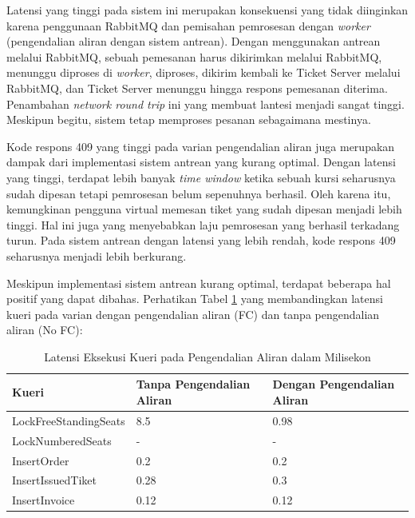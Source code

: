 Latensi yang tinggi pada sistem ini merupakan konsekuensi yang tidak diinginkan karena penggunaan RabbitMQ dan pemisahan pemrosesan dengan \textit{worker} (pengendalian aliran dengan sistem antrean). Dengan menggunakan antrean melalui RabbitMQ, sebuah pemesanan harus dikirimkan melalui RabbitMQ, menunggu diproses di \textit{worker}, diproses, dikirim kembali ke Ticket Server melalui RabbitMQ, dan Ticket Server menunggu hingga respons pemesanan diterima. Penambahan \textit{network round trip} ini yang membuat lantesi menjadi sangat tinggi. Meskipun begitu, sistem tetap memproses pesanan sebagaimana mestinya.

Kode respons 409 yang tinggi pada varian pengendalian aliran juga merupakan dampak dari implementasi sistem antrean yang kurang optimal. Dengan latensi yang tinggi, terdapat lebih banyak \textit{time window} ketika sebuah kursi seharusnya sudah dipesan tetapi pemrosesan belum sepenuhnya berhasil. Oleh karena itu, kemungkinan pengguna virtual memesan tiket yang sudah dipesan menjadi lebih tinggi. Hal ini juga yang menyebabkan laju pemrosesan yang berhasil terkadang turun. Pada sistem antrean dengan latensi yang lebih rendah, kode respons 409 seharusnya menjadi lebih berkurang.

Meskipun implementasi sistem antrean kurang optimal, terdapat beberapa hal positif yang dapat dibahas. Perhatikan Tabel \ref{table:latensi-kueri-fc-nofc} yang membandingkan latensi kueri pada varian dengan pengendalian aliran (FC) dan tanpa pengendalian aliran (No FC):

\begin{table}[h]
    \centering
    \caption{Latensi Eksekusi Kueri pada Pengendalian Aliran dalam Milisekon}
    \label{table:latensi-kueri-fc-nofc}
    \begin{tabular}{|l|l|l|}
        \hline
        \textbf{Kueri}        & \textbf{Tanpa Pengendalian Aliran} & \textbf{Dengan Pengendalian Aliran} \\
        \hline
        LockFreeStandingSeats & 8.5                                & 0.98                                \\
        \hline
        LockNumberedSeats     & -                                  & -                                   \\
        \hline
        InsertOrder           & 0.2                                & 0.2                                 \\
        \hline
        InsertIssuedTiket     & 0.28                               & 0.3                                 \\
        \hline
        InsertInvoice         & 0.12                               & 0.12                                \\
        \hline
    \end{tabular}
\end{table}

